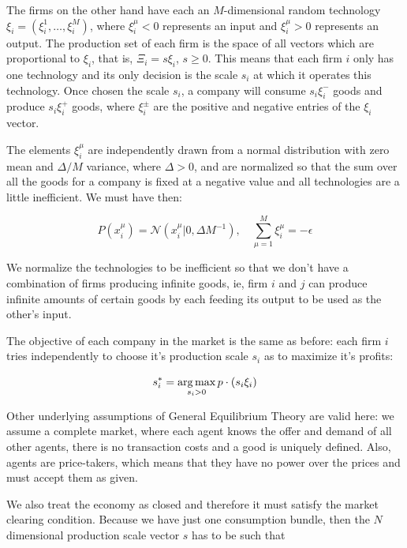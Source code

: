The firms on the other hand have each an $M$-dimensional random
technology $\xi_i = (\xi_i^1, \ldots, \xi_i^M)$, where $\xi_i^\mu<0$
represents an input and $\xi_i^\mu>0$ represents an output. The
production set of each firm is the space of all vectors which are
proportional to $\xi_i$, that is, $\Xi_i = s \xi_i$, $s \geq 0$. This
means that each firm $i$ only has one technology and its only decision
is the scale $s_i$ at which it operates this technology. Once chosen
the scale $s_i$, a company will consume $s_i \xi_i^-$ goods and
produce $s_i \xi_i^+$ goods, where $\xi_i^{\pm}$ are the positive and
negative entries of the $\xi_i$ vector.

The elements $\xi_i^\mu$ are independently drawn from a normal
distribution with zero mean and $\Delta/M$ variance, where $\Delta >
0$, and are normalized so that the
sum over all the goods for a company is fixed at a negative value and
all technologies are a little inefficient. We must have then:

\begin{equation}
  \label{eq:2}
  P(x_i^\mu) = \mathcal{N}(x_i^\mu | 0, \Delta M^{-1}), \quad \sum_{\mu=1}^M
  \xi_i^\mu = -\epsilon
\end{equation}


We normalize the technologies to be inefficient so that we don't have
a combination of firms producing infinite goods, ie, firm $i$
and $j$ can produce infinite amounts of certain goods by each feeding
its output to be used as the other's input. 

The objective of each company in the market is the same as before:
each firm $i$ tries independently to choose it's production scale
$s_i$ as to maximize it's profits:

\begin{equation}
  \label{eq:6}
  s_i^\ast = \operatorname*{arg\,max}_{s_i > 0} p\cdot (s_i \xi_i)
\end{equation}

Other underlying assumptions of General Equilibrium Theory are valid
here: we assume a complete market, where each agent knows the offer
and demand of all other agents, there is no transaction costs and a
good is uniquely defined. Also, agents are price-takers, which means
that they have no power over the prices and must accept them as given.

We also treat the economy as closed and therefore it must satisfy the market
clearing condition. Because we have just one consumption bundle, then
the $N$ dimensional production scale vector $s$ has to be such that

